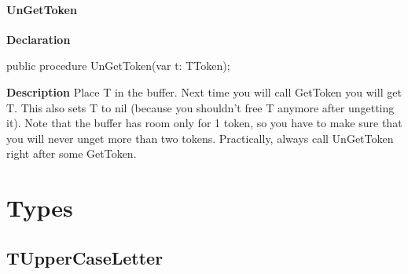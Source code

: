 \documentclass{report}
\newif\ifpdf
\begin{document}
\paragraph*{UnGetToken}\hspace*{\fill}

\label{PasDoc_Scanner.TScanner-UnGetToken}
\begin{list}{}{
\setlength{\itemindent}{0cm}
\setlength{\listparindent}{0cm}
\setlength{\leftmargin}{\evensidemargin}
\addtolength{\leftmargin}{\tmplength}
\settowidth{\labelsep}{X}
\addtolength{\leftmargin}{\labelsep}
\setlength{\labelwidth}{\tmplength}
}
\item[\textbf{Declaration}\hfill]
\ifpdf
\begin{flushleft}
\fi
\begin{ttfamily}
public procedure UnGetToken(var t: TToken);\end{ttfamily}

\ifpdf
\end{flushleft}
\fi

\par
\item[\textbf{Description}]
Place T in the buffer. Next time you will call GetToken you will get T. This also sets T to nil (because you shouldn't free T anymore after ungetting it). Note that the buffer has room only for 1 token, so you have to make sure that you will never unget more than two tokens. Practically, always call UnGetToken right after some GetToken.

\end{list}
\section{Types}
\ifpdf
\subsection*{\large{\textbf{TUpperCaseLetter}}\normalsize\hspace{1ex}\hrulefill}
\else
\end{document}
